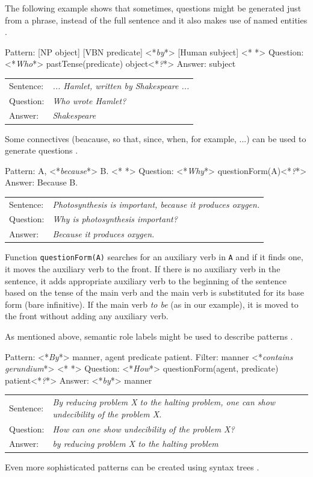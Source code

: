 \documentclass[a4paper, 12pt, twoside]{fithesis2}		%
\makeatletter
\renewcommand{\_}{\leavevmode \kern0.07em\vbox{\hrule width0.4em}}
\newcommand{\arrowlinesplit}{%
  \noindent\makebox[\linewidth]{\raisebox{0.15em}{\rule{0.478\textwidth}{0.5pt}}%
  ~$\downarrow$~%
  \noindent\raisebox{0.15em}{\rule{0.478\textwidth}{0.5pt}}}%
}
\newcommand{\transformationExample}[3]{%
\vspace{-0.5em}
\noindent %
\begin{tabularx}{\linewidth}{@{} l X @{}}
Sentence: & \emph{#1}\\
Question: & \emph{#2}\\
Answer:   & \emph{#3}\\
  \hline
\end{tabularx}
}
\makeatother
\begin{document}
\noindent
The following example shows that sometimes, questions might be generated just from a phrase, instead of the full sentence and it also makes use of named entities \cite{mentor}.
\begin{code}
Pattern: [NP object] [VBN predicate] <*\emph{by}*> [Human subject]
<*\arrowlinesplit*>
Question: <*\emph{Who}*> pastTense(predicate) object<*\emph{?}*>
Answer: subject
\end{code}
\transformationExample%
{... Hamlet, written by Shakespeare ...}%
{Who wrote Hamlet?}%
{Shakespeare}

\noindent
Some connectives (beacause, so that, since, when, for example, ...) can be used to generate questions
\cite{question-gen-connectives, questions-wolfe}.
\begin{code}
Pattern: A, <*\emph{because}*> B.
<*\arrowlinesplit*>
Question: <*\emph{Why}*> questionForm(A)<*\emph{?}*>
Answer: Because B.
\end{code}
\transformationExample%
{Photosynthesis is important, because it produces oxygen.}%
{Why is photosynthesis important?}%
{Because it produces oxygen.}

\noindent
Function \texttt{questionForm(A)} searches for an auxiliary verb in \texttt{A} and if it finds one, it moves the auxiliary verb to the front.
If there is no auxiliary verb in the sentence, it adds appropriate auxiliary verb to the beginning of the sentence based on the tense of the main verb and the main verb is substituted for its base form (bare infinitive).
If the main verb \emph{to be} (as in our example), it is moved to the front without adding any auxiliary verb.

\noindent
As mentioned above, semantic role labels might be used to describe patterns \cite{question-gen-mannem, questions-eval}.
\begin{code}
Pattern: <*\emph{By}*> manner, agent predicate patient.
Filter: manner <*\emph{contains gerundium}*>
<*\arrowlinesplit*>
Question: <*\emph{How}*> questionForm(agent, predicate) patient<*\emph{?}*>
Answer: <*\emph{by}*> manner
\end{code}
\transformationExample%
{By reducing problem X to the halting problem, one can show undecibility of the problem X.}%
{How can one show undecibility of the problem X?}%
{by reducing problem X to the halting problem}

\noindent
Even more sophisticated patterns can be created using syntax trees \cite{question-gen-ceist, question-overgenerating-rating}.
\end{document}
